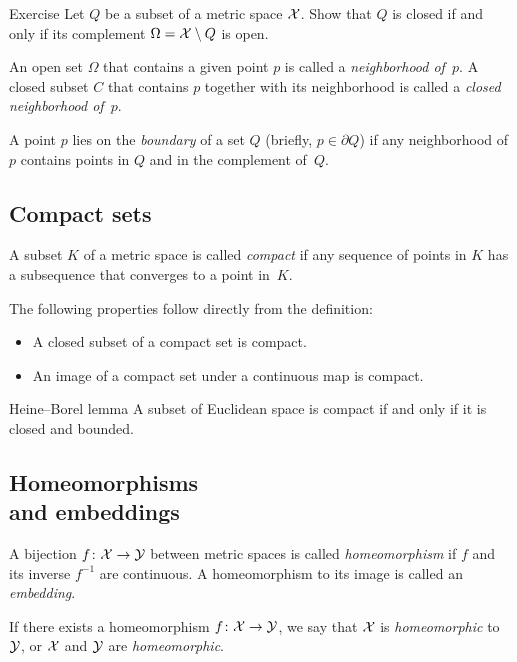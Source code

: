 \begin{multicols}{2}
{\begin{thm}{Exercise}\label{ex:close-open}
Let $Q$ be a subset of a metric space $\mathcal{X}$.
Show that $Q$ is closed if and only if its complement $\Omega=\mathcal{X}\setminus Q$ is open.
\end{thm}

An open set $\Omega$ that contains a given point $p$ is called a \emph{neighborhood of~$p$}.
A closed subset $C$ that contains $p$ together with its neighborhood is called a {}\emph{closed neighborhood of~$p$}.

A point $p$ lies on the \emph{boundary} of a set $Q$ (briefly, $p\in\partial Q$) if any neighborhood of $p$ contains points in $Q$ and in the complement of~$Q$.

\subsection*{Compact sets}

A subset $K$ of a metric space is called \emph{compact} if any sequence of points in $K$ has a subsequence that converges to a point in~$K$.

The following properties follow directly from the definition:

\begin{itemize}
\item A closed subset of a compact set is compact.
\item An image of a compact set under a continuous map is compact.
\end{itemize}

\begin{thm}{Heine--Borel lemma}\label{thm:Heine--Borel}
A subset of Euclidean space is compact if and only if it is closed and bounded.
\end{thm}


\subsection*{Homeomorphisms\\ and embeddings}

A bijection $f\colon\mathcal{X}\to\mathcal{Y}$ between metric spaces is called \emph{homeomorphism} if $f$ and its inverse $f^{-1}$ are continuous.
A homeomorphism to its image is called an \emph{embedding}.

If there exists a homeomorphism $f\:\spc{X}\z\to \spc{Y}$,
we say that ${\mathcal{X}}$ is {}\emph{homeomorphic} to $\mathcal{Y}$,
or $\mathcal{X}$ and $\mathcal{Y}$ are {}\emph{homeomorphic}.

}
\end{multicols}
